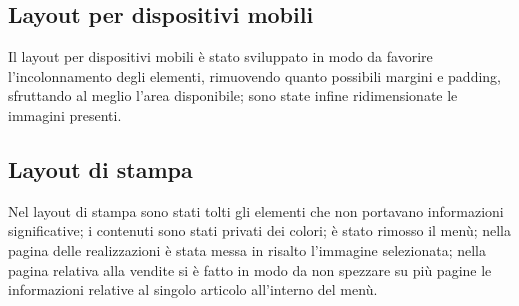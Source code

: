 {	\subsection{Layout per dispositivi mobili}{
		Il layout per dispositivi mobili è stato sviluppato in modo da favorire l'incolonnamento degli elementi, rimuovendo quanto possibili margini e padding, sfruttando al meglio l'area disponibile; sono state infine ridimensionate le immagini presenti.
	}
	\subsection{Layout di stampa}{
		Nel layout di stampa sono stati tolti gli elementi che non portavano informazioni significative; i contenuti sono stati privati dei colori; è stato rimosso il menù; nella pagina delle realizzazioni è stata messa in risalto l'immagine selezionata; nella pagina relativa alla vendite si è fatto in modo da non spezzare su più pagine le informazioni relative al singolo articolo all'interno del menù.
	}
}